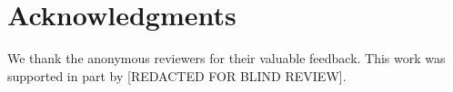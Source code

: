 \documentclass[conference,compsoc]{IEEEtran}
\begin{document}
















\section*{Acknowledgments}

We thank the anonymous reviewers for their valuable feedback. This work was supported in part by [REDACTED FOR BLIND REVIEW].

{\scriptsize


}








\end{document}
